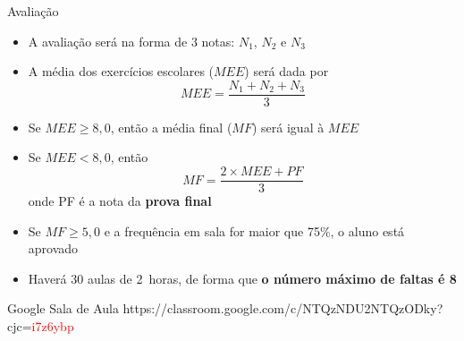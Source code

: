 \begin{frame}{Avaliação}
    \begin{itemize}
        \item A avaliação será na forma de 3 notas: \(N_1\), \(N_2\) e \(N_3\)
        \item A média dos exercícios escolares (\(MEE\)) será dada por
            \[
                MEE=\frac{N_1+N_2+N_3}{3}
            \]
        \item Se \(MEE \geq 8,0\), então a média final (\(MF\)) será igual à \(MEE\)
        \item Se \(MEE < 8,0\), então
            \[
                MF=\frac{2\times MEE+PF}{3}
            \]
            onde PF é a nota da \textbf{prova final}
        \item Se \(MF \geq 5,0\) e a frequência em sala for maior que 75\%, o aluno está aprovado
        \item Haverá 30 aulas de \SI{2}{horas}, de forma que \textbf{o número máximo de faltas é 8}

    \end{itemize}
\end{frame}

\begin{frame}{Google Sala de Aula}
    \centering
    \large{https://classroom.google.com/c/NTQzNDU2NTQzODky?cjc=\textcolor{red}{i7z6ybp}}
\end{frame}

